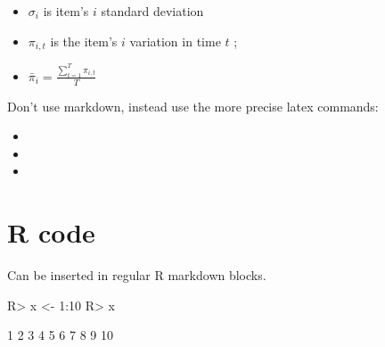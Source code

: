 \documentclass[article]{jss}
\providecommand{\tightlist}{%
  \setlength{\itemsep}{0pt}\setlength{\parskip}{0pt}}
\begin{document}
\begin{itemize}
\tightlist
\item
  \(\sigma_i\) is item's \(i\) standard deviation
\item
  \(\pi_{i,t}\) is the item's \(i\) variation in time \(t\) ;
\item
  \(\bar{\pi}_{i} = \frac{\sum_{t=1}^{T}{\pi_{i,t}}}{T}\)
\end{itemize}

Don't use markdown, instead use the more precise latex commands:

\begin{itemize}
\tightlist
\item
\item
\item
\end{itemize}

\section{R code}\label{r-code}

Can be inserted in regular R markdown blocks.

\begin{CodeChunk}

\begin{CodeInput}
R> x <- 1:10
R> x
\end{CodeInput}

\begin{CodeOutput}
 [1]  1  2  3  4  5  6  7  8  9 10
\end{CodeOutput}
\end{CodeChunk}


\end{document}
